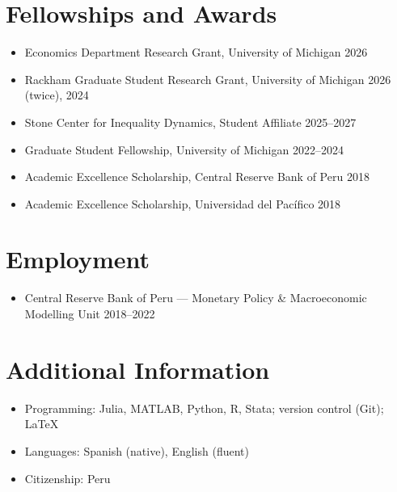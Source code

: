 \documentclass[letterpaper]{article}
\newcommand{\daterange}[1]{\hfill #1}
\begin{document}

\section*{Fellowships and Awards}
\begin{itemize}
  \item Economics Department Research Grant, University of Michigan \daterange{2026}
  \item Rackham Graduate Student Research Grant, University of Michigan \daterange{2026 (twice), 2024}
  \item Stone Center for Inequality Dynamics, Student Affiliate \daterange{2025--2027}
  \item Graduate Student Fellowship, University of Michigan \daterange{2022--2024}
  \item Academic Excellence Scholarship, Central Reserve Bank of Peru \daterange{2018}
  \item Academic Excellence Scholarship, Universidad del Pac\'ifico \daterange{2018}
\end{itemize}

\section*{Employment}
\begin{itemize}
  \item Central Reserve Bank of Peru --- Monetary Policy \& Macroeconomic Modelling Unit \daterange{2018--2022}
\end{itemize}

\section*{Additional Information}
\begin{itemize}
  \item Programming: Julia, MATLAB, Python, R, Stata; version control (Git); \LaTeX
  \item Languages: Spanish (native), English (fluent)
  \item Citizenship: Peru
\end{itemize}
\end{document}
